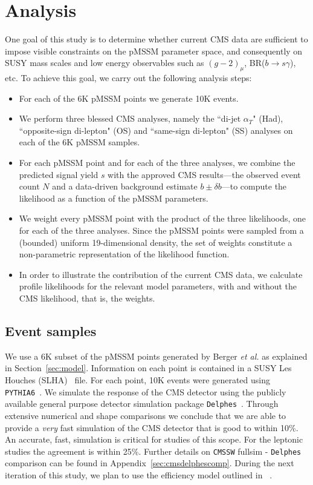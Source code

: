 \section{Analysis}
\label{sec:analysis}

One goal of this study is to determine whether current CMS data are sufficient to impose visible constraints on the pMSSM parameter space, and consequently on SUSY mass scales and low energy observables such as $(g-2)_\mu$, BR($b\rightarrow s\gamma$), etc.  To achieve this goal, we carry out the following analysis steps:
\begin{itemize}
\item For each of the 6K pMSSM points we generate 10K events.
\item We perform three blessed CMS analyses, namely the
 ``di-jet $\alpha_T$" (Had), ``opposite-sign di-lepton" (OS) and ``same-sign di-lepton" (SS) 
 analyses on each of the 6K pMSSM samples.
\item For each pMSSM point and for each of the three analyses, we combine the 
predicted signal yield $s$ with the approved CMS results---the
observed event count $N$ and 
a data-driven background estimate $b \pm \delta b$---to compute the likelihood as a function
of the pMSSM parameters. 
\item We weight every pMSSM point with the product of the three likelihoods, one  for each
of the three analyses. Since the pMSSM points were sampled from a (bounded) 
uniform  19-dimensional density, the set of weights constitute a non-parametric 
representation of the likelihood function. 
\item In order to illustrate the contribution of the current CMS data, we calculate profile likelihoods 
for the relevant model parameters, with and without the CMS likelihood, that is, the weights.  \end{itemize}

\subsection{Event samples}

We use a 6K subset of the pMSSM points generated by Berger \emph{et al.} 
as explained in Section~\ref{sec:model}.  Information on each point is contained in a SUSY Les Houches (SLHA)~\cite{Skands:2003cj} file.  For each point, 10K events were generated using {\tt PYTHIA6}~\cite{Sjostrand:2006za}.  We simulate the response of the CMS detector using
the publicly available general purpose detector simulation package {\tt Delphes}~\cite{Ovyn:2009tx}.  Through extensive numerical and shape comparisons we
conclude that we are able to provide a \emph{very} fast simulation of the CMS detector 
that is good to within 10\%. An accurate,  fast, simulation is critical for studies
of this scope. For the leptonic studies the agreement is within 25\%. Further details on {\tt CMSSW} fullsim - {\tt Delphes} comparison can be found in Appendix~\ref{sec:cmsdelphescomp}.
During the next iteration of this study, we plan to 
use the efficiency model outlined in ~\cite{sspaper}.


